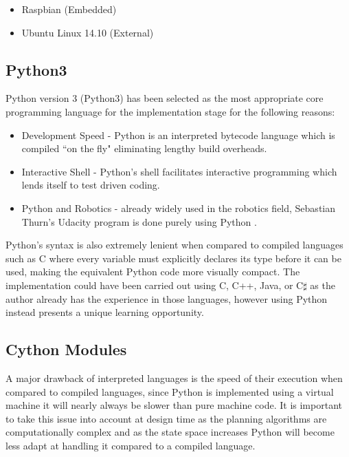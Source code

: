 \begin{itemize}
\item Raspbian (Embedded)
\item Ubuntu Linux 14.10 (External)
\end{itemize} 

\newpage

\subsection{Python3}
Python version 3 (Python3) has been selected as the most appropriate core programming language for the implementation stage for the following reasons:

\begin{itemize}
\item Development Speed - Python is an interpreted bytecode language which is compiled ``on the fly" eliminating lengthy build overheads.
\item Interactive Shell - Python's shell facilitates interactive programming which lends itself to test driven coding.
\item Python and Robotics - already widely used in the robotics field, Sebastian Thurn's Udacity program is done purely using Python \cite{THRUN}.
\end{itemize} 

\noindent
Python's syntax is also extremely lenient when compared to compiled languages such as C where every variable must explicitly declares its type before it can be used, making the equivalent Python code more visually compact. The implementation could have been carried out using C, C++, Java, or C$\sharp$ as the author already has the experience in those languages, however using Python instead presents a unique learning opportunity. 

\subsection{Cython Modules}
\noindent
A major drawback of interpreted languages is the speed of their execution when compared to compiled languages, since Python is implemented using a virtual machine it will nearly always be slower than pure machine code. It is important to take this issue into account at design time as the planning algorithms are computationally complex and as the state space increases Python will become less adapt at handling it compared to a compiled language. \\

